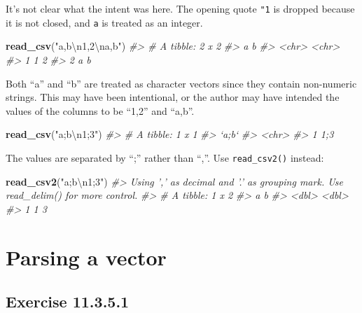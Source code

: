 \documentclass[]{book}
\newenvironment{Shaded}{\begin{snugshade}}{\end{snugshade}}
\newcommand{\CharTok}[1]{\textcolor[rgb]{0.31,0.60,0.02}{#1}}
\newcommand{\CommentTok}[1]{\textcolor[rgb]{0.56,0.35,0.01}{\textit{#1}}}
\newcommand{\KeywordTok}[1]{\textcolor[rgb]{0.13,0.29,0.53}{\textbf{#1}}}
\newcommand{\NormalTok}[1]{#1}
\newcommand{\StringTok}[1]{\textcolor[rgb]{0.31,0.60,0.02}{#1}}
\theoremstyle{plain}
\theoremstyle{remark}
\begin{document}
It's not clear what the intent was here.
The opening quote \texttt{"1} is dropped because it is not closed, and \texttt{a} is treated as an integer.

\begin{Shaded}
\begin{Highlighting}[]
\KeywordTok{read_csv}\NormalTok{(}\StringTok{"a,b}\CharTok{\textbackslash{}n}\StringTok{1,2}\CharTok{\textbackslash{}n}\StringTok{a,b"}\NormalTok{)}
\CommentTok{#> # A tibble: 2 x 2}
\CommentTok{#>   a     b    }
\CommentTok{#>   <chr> <chr>}
\CommentTok{#> 1 1     2    }
\CommentTok{#> 2 a     b}
\end{Highlighting}
\end{Shaded}

Both ``a'' and ``b'' are treated as character vectors since they contain non-numeric strings.
This may have been intentional, or the author may have intended the values of the columns to be ``1,2'' and ``a,b''.

\begin{Shaded}
\begin{Highlighting}[]
\KeywordTok{read_csv}\NormalTok{(}\StringTok{"a;b}\CharTok{\textbackslash{}n}\StringTok{1;3"}\NormalTok{)}
\CommentTok{#> # A tibble: 1 x 1}
\CommentTok{#>   `a;b`}
\CommentTok{#>   <chr>}
\CommentTok{#> 1 1;3}
\end{Highlighting}
\end{Shaded}

The values are separated by ``;'' rather than ``,''. Use \texttt{read\_csv2()} instead:

\begin{Shaded}
\begin{Highlighting}[]
\KeywordTok{read_csv2}\NormalTok{(}\StringTok{"a;b}\CharTok{\textbackslash{}n}\StringTok{1;3"}\NormalTok{)}
\CommentTok{#> Using ',' as decimal and '.' as grouping mark. Use read_delim() for more control.}
\CommentTok{#> # A tibble: 1 x 2}
\CommentTok{#>       a     b}
\CommentTok{#>   <dbl> <dbl>}
\CommentTok{#> 1     1     3}
\end{Highlighting}
\end{Shaded}

\hypertarget{parsing-a-vector}{%
\section{Parsing a vector}\label{parsing-a-vector}}

\hypertarget{exercise-11.3.5.1}{%
\subsection*{\texorpdfstring{Exercise {11.3.5.1}}{Exercise 11.3.5.1}}\label{exercise-11.3.5.1}}
\end{document}
